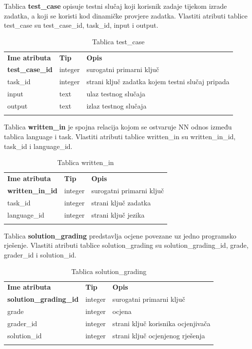 \documentclass[times, utf8, zavrsni, numeric]{fer}
\begin{document}
		Tablica \textbf{test\_case} opisuje testni slučaj koji korisnik zadaje tijekom izrade zadatka, a koji se koristi kod dinamičke provjere zadatka. Vlastiti atributi tablice test\_case su test\_case\_id, task\_id, input i output. 
		\begin{table}[H]
			\caption{Tablica test\_case}
			\label{tbl:testcase}
			\centering
			\begin{tabu} to \textwidth {XXX}
				\tabucline[1.75pt]{-}
				\textbf{Ime atributa} & \textbf{Tip} & \textbf{Opis}\\ 				
				\tabucline[1.75pt]{-}
				\textbf{test\_case\_id} & integer & surogatni primarni ključ\\ \hline
				task\_id & integer & strani ključ zadatka kojem testni slučaj pripada\\ \hline
				input & text & ulaz testnog slučaja\\ \hline
				output & text & izlaz testnog slučaja\\ \hline
				\tabucline[1.75pt]{-}
			\end{tabu}
		\end{table}
		
		Tablica \textbf{written\_in} je spojna relacija kojom se ostvaruje NN odnos između tablica language i task. Vlastiti atributi tablice written\_in su written\_in\_id, task\_id i language\_id. 
		\begin{table}[H]
			\caption{Tablica written\_in}
			\label{tbl:writtenin}
			\centering
			\begin{tabu} to \textwidth {XXX}
				\tabucline[1.75pt]{-}
				\textbf{Ime atributa} & \textbf{Tip} & \textbf{Opis}\\ 				
				\tabucline[1.75pt]{-}
				\textbf{written\_in\_id} & integer & surogatni primarni ključ\\ \hline
				task\_id & integer & strani ključ zadatka\\ \hline
				language\_id & integer & strani ključ jezika\\ \hline
				\tabucline[1.75pt]{-}
			\end{tabu}
		\end{table}
		
		Tablica \textbf{solution\_grading} predstavlja ocjene povezane uz jedno programsko rješenje. Vlastiti atributi tablice solution\_grading su solution\_grading\_id, grade, grader\_id i solution\_id. 
		\begin{table}[H]
			\caption{Tablica solution\_grading}
			\label{tbl:solutiongrading}
			\centering
			\begin{tabu} to \textwidth {XXX}
				\tabucline[1.75pt]{-}
				\textbf{Ime atributa} & \textbf{Tip} & \textbf{Opis}\\ 				
				\tabucline[1.75pt]{-}
				\textbf{solution\_grading\_id} & integer & surogatni primarni ključ\\ \hline
				grade & integer & ocjena\\ \hline
				grader\_id & integer & strani ključ korisnika ocjenjivača\\ \hline
				solution\_id & integer & strani ključ ocjenjenog rješenja\\ \hline
				\tabucline[1.75pt]{-}
			\end{tabu}
		\end{table}
	
\end{document}
